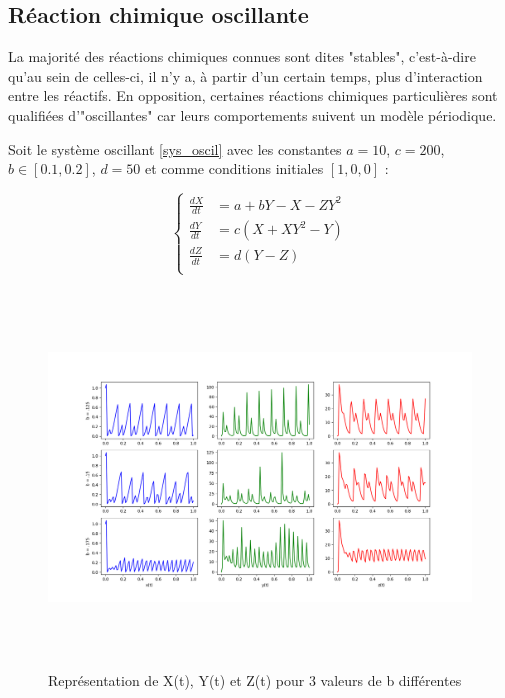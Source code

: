 \documentclass{article}
\begin{document}
\subsection{Réaction chimique oscillante}

 La majorité des réactions chimiques connues sont dites "stables", c'est-à-dire qu'au sein de celles-ci, il n'y a, à partir d'un certain temps, plus d'interaction entre les réactifs. En opposition, certaines réactions chimiques particulières sont qualifiées d'"oscillantes" car leurs comportements suivent un modèle périodique. 

Soit le système oscillant \eqref{sys_oscil} avec les constantes $a=10$, $c=200$, $b\in[0.1, 0.2]$, $d=50$ et comme conditions initiales $[1, 0, 0]$ :

\begin{equation}
\label{sys_oscil}
\left\{
\begin{aligned}
\frac{dX}{dt} &= a + bY - X - ZY^2 \\
\frac{dY}{dt} &= c(X + XY^2 - Y) \\
\frac{dZ}{dt} &= d(Y - Z) \\
\end{aligned}
\right.
\end{equation}

\begin{figure}[h]
    \centering
    \includegraphics[width=13cm, height = 10cm]{img/graph_reac_chim_2.png}
    \caption{Représentation de X(t), Y(t) et Z(t) pour 3 valeurs de b différentes}
    \label{fig:grc2}
\end{figure}
\end{document}
